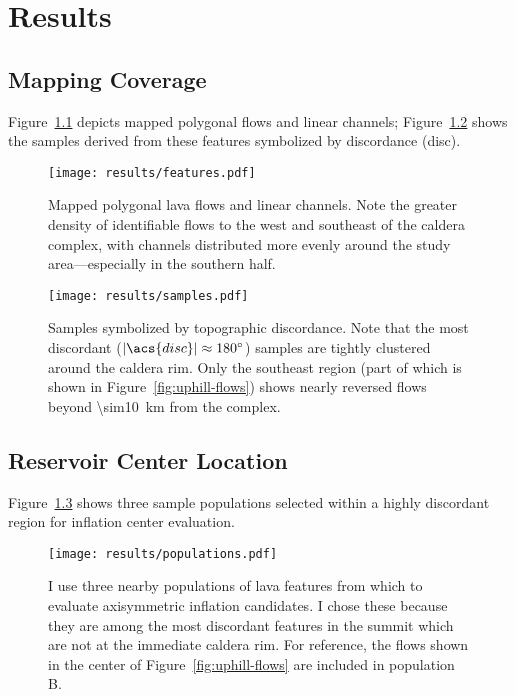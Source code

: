 \chapter{Results}\label{cha:results}

\section{Mapping Coverage}

Figure~\ref{fig:features} depicts mapped polygonal flows and linear channels; Figure~\ref{fig:samples} shows the samples derived from these features symbolized by discordance (\acs{disc}).

\begin{figure}
    \texttt{[image: results/features.pdf]}%
    \caption[Mapped lava features]{Mapped polygonal lava flows and linear channels. Note the greater density of identifiable flows to the west and southeast of the caldera complex, with channels distributed more evenly around the study area---especially in the southern half.}%
    \label{fig:features}
\end{figure}

\begin{figure}
    \texttt{[image: results/samples.pdf]}%
    \caption[Mapped topographic discordance]{Samples symbolized by topographic discordance. Note that the most discordant ($|\acs{disc}|\approx\ang{180}$) samples are tightly clustered around the caldera rim. Only the southeast region (part of which is shown in Figure~\ref{fig:uphill-flows}) shows nearly reversed flows beyond \qty{\sim10}{\km} from the complex.}%
    \label{fig:samples}
\end{figure}

\section{Reservoir Center Location}

Figure~\ref{fig:populations} shows three sample populations selected within a highly discordant region for inflation center evaluation.

\begin{figure}
    \texttt{[image: results/populations.pdf]}%
    \caption[Sample populations for inflation center evaluation]{I use three nearby populations of lava features from which to evaluate axisymmetric inflation candidates. I chose these because they are among the most discordant features in the summit which are not at the immediate caldera rim. For reference, the flows shown in the center of Figure~\ref{fig:uphill-flows} are included in population B.}%
    \label{fig:populations}
\end{figure}

